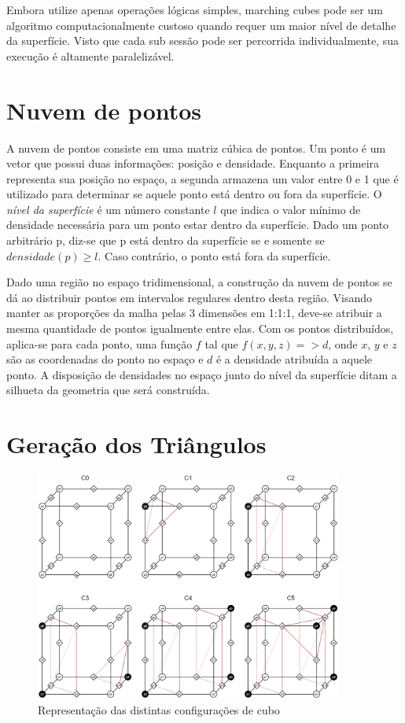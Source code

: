 Embora utilize apenas operações lógicas simples, marching cubes pode ser um algoritmo computacionalmente custoso quando requer um maior nível de detalhe da superfície. Visto que cada sub sessão pode ser percorrida individualmente, sua execução é altamente paralelizável. 

\section{Nuvem de pontos}\label{sec:LABEL_CASOS_DE_ESTUDOS_SEC_B}

A nuvem de pontos consiste em uma matriz cúbica de pontos. Um ponto é um vetor que possui duas informações: posição e densidade. Enquanto a primeira representa sua posição no espaço, a segunda armazena um valor entre 0 e 1 que é utilizado para determinar se aquele ponto está dentro ou fora da superfície. O \textit{nível da superfície} é um número constante $l$ que indica o valor mínimo de densidade necessária para um ponto estar dentro da superfície. Dado um ponto arbitrário p, diz-se que p está dentro da superfície se e somente se $densidade(p) \geq l$. Caso contrário, o ponto está fora da superfície.


Dado uma região no espaço tridimensional, a construção da nuvem de pontos se dá ao distribuir pontos em intervalos regulares dentro desta região. Visando manter as proporções da malha pelas 3 dimensões em 1:1:1, deve-se atribuir a mesma quantidade de pontos igualmente entre elas. Com os pontos distribuídos, aplica-se para cada ponto, uma função $f$ tal que $f(x, y, z) => d$, onde $x$, $y$ e $z$ são as coordenadas do ponto no espaço e $d$ é a densidade atribuída a aquele ponto. A disposição de densidades no espaço junto do nível da superfície ditam a silhueta da geometria que será construída.

\section{Geração dos Triângulos}\label{sec:LABEL_CASOS_DE_ESTUDOS_SEC_C}

\begin{figure}
\centering
\includegraphics[width=0.9\textwidth]{imagens/MC-ConfiguracoesCubo.png}
\caption{Representação das distintas configurações de cubo}
\label{fig:LABEL_FIG_CONFIGURACOES_CUBO}
\end{figure}

